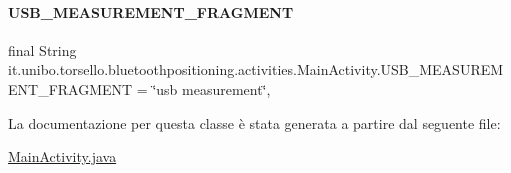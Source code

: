 \hypertarget{classit_1_1unibo_1_1torsello_1_1bluetoothpositioning_1_1activities_1_1MainActivity_a64bac06e6db556ba1e36c8773e61137b_a64bac06e6db556ba1e36c8773e61137b}{}\label{classit_1_1unibo_1_1torsello_1_1bluetoothpositioning_1_1activities_1_1MainActivity_a64bac06e6db556ba1e36c8773e61137b_a64bac06e6db556ba1e36c8773e61137b} 
\paragraph{\texorpdfstring{U\+S\+B\+\_\+\+M\+E\+A\+S\+U\+R\+E\+M\+E\+N\+T\+\_\+\+F\+R\+A\+G\+M\+E\+NT}{USB\_MEASUREMENT\_FRAGMENT}}
{\footnotesize\ttfamily final String it.\+unibo.\+torsello.\+bluetoothpositioning.\+activities.\+Main\+Activity.\+U\+S\+B\+\_\+\+M\+E\+A\+S\+U\+R\+E\+M\+E\+N\+T\+\_\+\+F\+R\+A\+G\+M\+E\+NT = \char`\"{}usb measurement\char`\"{}\hspace{0.3cm}{\ttfamily [static]}, {\ttfamily [private]}}



La documentazione per questa classe è stata generata a partire dal seguente file\+:\begin{DoxyCompactItemize}
\item 
\hyperlink{MainActivity_8java}{Main\+Activity.\+java}\end{DoxyCompactItemize}
